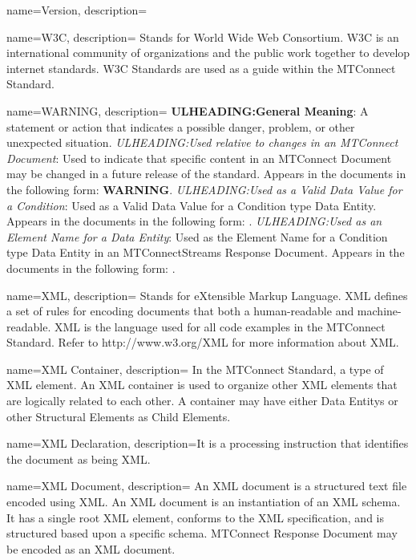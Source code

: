 {
    name={Version},
	description={}
}

{
    name={W3C},
	description={
	Stands for World Wide Web Consortium.
	W3C is an international community of organizations and the public work together to develop internet standards.  
	W3C Standards are used as a guide within the MTConnect Standard.
}
}

{
    name={WARNING},
	description={
	\textbf{ULHEADING:General Meaning}:
	A statement or action that indicates a possible danger, problem, or other unexpected situation.
	\textit{ULHEADING:Used relative to changes in an \gls{MTConnect Document}}:
	Used to indicate that specific content in an \gls{MTConnect Document} may be changed in a future release of the standard.
	Appears in the documents in the following form: \textbf{WARNING}.
	\textit{ULHEADING:Used as a \gls{Valid Data Value} for a \gls{Condition}}:
	Used as a \gls{Valid Data Value} for a \gls{Condition} type \gls{Data Entity}.
	Appears in the documents in the following form: .
	\textit{ULHEADING:Used as an \gls{Element Name} for a \gls{Data Entity}}:
	Used as the \gls{Element Name} for a \gls{Condition} type \gls{Data Entity} in an \gls{MTConnectStreams Response Document}.
	Appears in the documents in the following form: .
}
}

{
    name={XML},
	description={
	Stands for eXtensible Markup Language. 
	XML defines a set of rules for encoding documents that both a human-readable and machine-readable.
	XML is the language used for all code examples in the MTConnect Standard.
	Refer to http://www.w3.org/XML for more information about XML.
}
}

{
    name={XML Container},
	description={
	In the MTConnect Standard, a type of XML element.
	An XML container is used to organize other XML elements that are logically related to each other.   A container may have either \glspl{Data Entity} or other \glspl{Structural Element} as \gls{Child Elements}.
}
}

{
    name={XML Declaration},
	description={It is a processing instruction that identifies the document as being XML.}
}

{
    name={XML Document},
	description={
	An XML document is a structured text file encoded using XML.
	An XML document is an instantiation of an XML schema.  It has a single root XML element, conforms to the XML specification, and is structured based upon a specific schema.
	\gls{MTConnect Response Document} may be encoded as an XML document.
}
}

